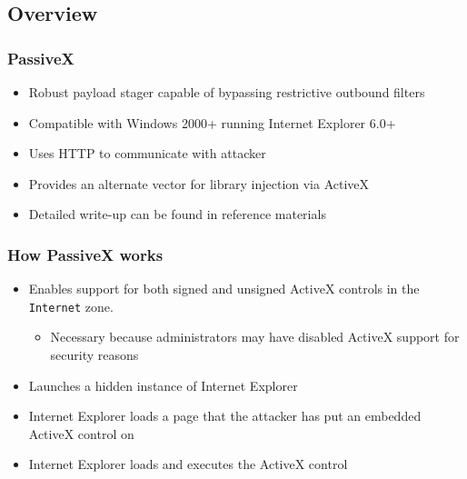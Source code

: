 \documentclass{beamer}
\newenvironment{sitemize}{\vspace{1mm}\begin{itemize}\itemsep 4pt\small}{\end{itemize}}
\begin{document}
\subsection{Overview}
\begin{frame}[t]
    \frametitle{PassiveX}

    \begin{sitemize}
        \item Robust payload stager capable of bypassing restrictive
        outbound filters
        \item Compatible with Windows 2000+ running Internet
        Explorer 6.0+
        \item Uses HTTP to communicate with attacker
        \item Provides an alternate vector for library injection via
        ActiveX
        \item Detailed write-up can be found in reference materials
    \end{sitemize}
\end{frame}

\begin{frame}[t]
    \frametitle{How PassiveX works}

    \begin{sitemize}
        \item Enables support for both signed and unsigned ActiveX
        controls in the \texttt{Internet} zone.
        \begin{sitemize}
            \pause
            \item Necessary because administrators may have disabled
            ActiveX support for security reasons
        \end{sitemize}

        \pause
        \item Launches a hidden instance of Internet Explorer

        \pause
        \item Internet Explorer loads a page that the attacker
        has put an embedded ActiveX control on

        \pause
        \item Internet Explorer loads and executes the ActiveX
        control
    \end{sitemize}
\end{frame}
\end{document}
